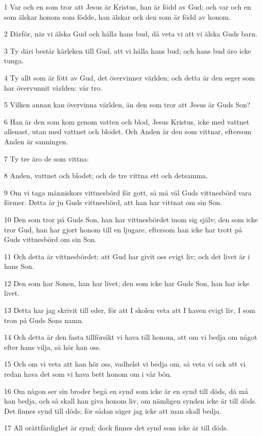 \par 1 Var och en som tror att Jesus är Kristus, han är född av Gud; och var och en som älskar honom som födde, han älskar ock den som är född av honom.
\par 2 Därför, när vi älska Gud och hålla hans bud, då veta vi att vi älska Guds barn.
\par 3 Ty däri består kärleken till Gud, att vi hålla hans bud; och hans bud äro icke tunga.
\par 4 Ty allt som är fött av Gud, det övervinner världen; och detta är den seger som har övervunnit världen: vår tro.
\par 5 Vilken annan kan övervinna världen, än den som tror att Jesus är Guds Son?
\par 6 Han är den som kom genom vatten och blod, Jesus Kristus, icke med vattnet allenast, utan med vattnet och blodet. Och Anden är den som vittnar, eftersom Anden är sanningen.
\par 7 Ty tre äro de som vittna:
\par 8 Anden, vattnet och blodet; och de tre vittna ett och detsamma.
\par 9 Om vi taga människors vittnesbörd för gott, så må väl Guds vittnesbörd vara förmer. Detta är ju Guds vittnesbörd, att han har vittnat om sin Son.
\par 10 Den som tror på Guds Son, han har vittnesbördet inom sig själv; den som icke tror Gud, han har gjort honom till en ljugare, eftersom han icke har trott på Guds vittnesbörd om sin Son.
\par 11 Och detta är vittnesbördet: att Gud har givit oss evigt liv; och det livet är i hans Son.
\par 12 Den som har Sonen, han har livet; den som icke har Guds Son, han har icke livet.
\par 13 Detta har jag skrivit till eder, för att I skolen veta att I haven evigt liv, I som tron på Guds Sons namn.
\par 14 Och detta är den fasta tillförsikt vi hava till honom, att om vi bedja om något efter hans vilja, så hör han oss.
\par 15 Och om vi veta att han hör oss, vadhelst vi bedja om, så veta vi ock att vi redan hava det som vi hava bett honom om i vår bön.
\par 16 Om någon ser sin broder begå en synd som icke är en synd till döds, då må han bedja, och så skall han giva honom liv, om nämligen synden icke är till döds. Det finnes synd till döds; för sådan säger jag icke att man skall bedja.
\par 17 All orättfärdighet är synd; dock finnes det synd som icke är till döds.

